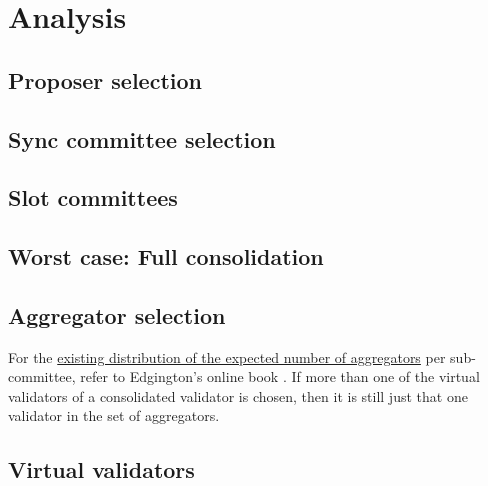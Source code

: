 \documentclass[UTF8]{article}
\begin{document}
\section{Analysis}
\label{sec:analysis}

\subsection{Proposer selection}

\subsection{Sync committee selection}

\subsection{Slot committees}

\subsection{Worst case: Full consolidation}

\subsection{Aggregator selection}
For the \href{https://eth2book.info/capella/part2/building_blocks/aggregator/}{existing distribution of the expected number of aggregators} per sub-committee, refer to Edgington's online book \cite{Edgington2023}.
If more than one of the virtual validators of a consolidated validator is chosen, then it is still just that one validator in the set of aggregators. 

\subsection{Virtual validators}
\end{document}
